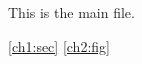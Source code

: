 \documentclass{article}
\begin{document}
\label{main:top}
This is the main file.


\ref{ch1:sec}
\ref{ch2:fig}
\end{document}
